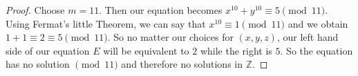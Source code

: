 \documentclass{article}
\begin{document}
\begin{enumerate}
\begin{proof}
    Choose $m=11$. Then our equation becomes $x^{10}+y^{10}\equiv 5\pmod{11}$. Using Fermat's little
    Theorem, we can say that $x^{10}\equiv 1\pmod{11}$ and we obtain $1+1\equiv 2\equiv 5\pmod{11}$. So no
    matter our choices for $(x,y,z)$, our left hand side of our equation $E$ will be equivalent to $2$
    while the right is $5$. So the equation has no solution $\pmod{11}$ and therefore no solutions in 
    $\mathbb{Z}$.
\end{proof}
\end{enumerate}
\end{document}
